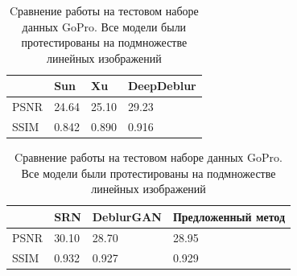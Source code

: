 \begin{table}[ht]
\caption{Cравнение работы на тестовом наборе данных GoPro. Все модели были протестированы на подмножестве линейных изображений}

    \begin{tabular}{
      |p{} %
      |p{}
      |p{} %
      |p{}|%
      }
      \hline
      & Sun  \cite{krishnan} & Xu \cite{whyte} & DeepDeblur \cite{xu} \\
      \hline
      PSNR & 24.64 & 25.10 &  29.23\\
      \hline
      SSIM & 0.842 &  0.890 &   0.916\\
      \hline
    \end{tabular}


    \begin{tabular}{
      |p{} %
      |p{}
      |p{} %
      |p{}|%
      }
      \hline
      & SRN \cite{srn} & DeblurGAN \cite{dganv2} & Предложенный метод   \\
      \hline
      PSNR & 30.10 &  28.70 & 28.95 \\
      \hline
      SSIM & 0.932 & 0.927 &  0.929 \\
      \hline
    \end{tabular}
  \label{Tab:res}
\end{table}


